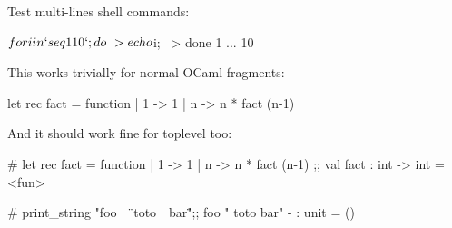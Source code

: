 Test multi-lines shell commands:

\begin{sh}
$ for i in `seq 1 10`; do \
>   echo $i; \
> done
1
...
10
\end{sh}

This works trivially for normal OCaml fragments:

\begin{ocaml}
let rec fact = function
| 1 -> 1
| n -> n * fact (n-1)
\end{ocaml}

And it should work fine for toplevel too:

\begin{ocaml}
# let rec fact = function
  | 1 -> 1
  | n -> n * fact (n-1)
  ;;
val fact : int -> int = <fun>
\end{ocaml}

\begin{ocaml}
# print_string "foo \
  \" \
  toto\
  \ bar\"";;
foo " toto bar"
- : unit = ()
\end{ocaml}
